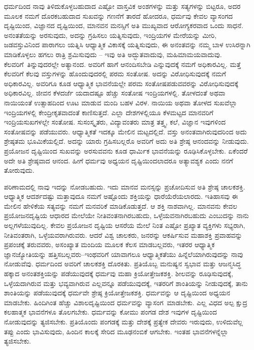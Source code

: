 ಧರ್ಮದಿಂದ ನಾವು ತಿಳಿದುಕೊಳ್ಳಬಹುದಾದ ಎಷ್ಟೋ ವಾಸ್ತವಿಕ ಅಂಶಗಳನ್ನು ಮತ್ತು ಸತ್ಯಗಳನ್ನು ಬಿಟ್ಟರೂ, ಅದರ ಮೂಲಕ ನಮಗೆ ದೊರಕಬಹುದಾದ ಸುಖವನ್ನು ಗಣನೆಗೆ ತಾರದೆ ಹೋದರೂ, ಧರ್ಮವು ಕೇವಲ ವ್ಯಾಸಂಗದ ದೃಷ್ಟಿಯಿಂದ, ವಿಜ್ಞಾನದ ದೃಷ್ಟಿಯಿಂದ, ಮಾನವನ ಮನಸ್ಸಿಗೆ ಅತಿ ಮುಖ್ಯವಾದ ಆರೋಗ್ಯಕರವಾದ ಒಂದು ಸಾಧನೆ. ಅನಂತತೆಯನ್ನು ಅರಸುವುದು, ಅದನ್ನು ಗ್ರಹಿಸಲು ಯತ್ನಿಸುವುದು, ಇಂದ್ರಿಯಗಳ ಮೇರೆಯನ್ನು ಮೀರಿ, ಜಡವಸ್ತುವಿನಿಂದ ಪಾರಾಗಲು ಯತ್ನಿಸಿ ಆಧ್ಯಾತ್ಮಿಕ ವಿಕಾಸಕ್ಕೆ ಯತ್ನಿಸುವುದು, ಈ ಅನಂತವನ್ನು ನಮ್ಮ ಬಾಳ ಉಸಿರನ್ನಾಗಿ ಮಾಡಿಕೊಳ್ಳಲು ಹಗಲು ರಾತ್ರಿ ಶ್ರಮಿಸುವುದು – ಇವು ಅತಿ ಅದ್ಭುತವಾದುವು, ಮಹಿಮಾಮಯವಾದುವು. ಕೆಲವರಿಗೆ\break\ ತಿನ್ನುವುದರಲ್ಲೇ ಅತ್ಯಾನಂದ. ಅವರಿಗೆ ಹಾಗೆ ಆನಂದಿಸಬೇಡಿ ಎನ್ನುವುದಕ್ಕೆ ನಮಗೆ ಅಧಿಕಾರವಿಲ್ಲ. ಮತ್ತೆ ಕೆಲವರಿಗೆ ಕೆಲವು ವಸ್ತುಗಳನ್ನು ಹೊಂದುವುದರಲ್ಲಿ ಪರಮ ಸಂತೋಷ. ಅದನ್ನು ವಿರೋಧಿಸುವುದಕ್ಕೆ ನಮಗೆ ಅಧಿಕಾರವಿಲ್ಲ. ಅವರಿಗೂ ಕೂಡ ಆಧ್ಯಾತ್ಮಿಕ ಭಾವನೆಯಲ್ಲೇ ಪರಮ ಸಂತೋಷಪಡುವವರನ್ನು ವಿರೋಧಿಸುವುದಕ್ಕೆ ಅಧಿಕಾರವಿಲ್ಲ. ಜೀವನ ಕೆಳದರ್ಜೆ ಯದಾದಷ್ಟೂ ಹೆಚ್ಚು ಸಂತೋಷ ಇಂದ್ರಿಯಗಳಲ್ಲಿ. ತೋಳದಂತೆ ಅಥವಾ ನಾಯಿಯಂತೆ ಉತ್ಸಾಹದಿಂದ ಊಟ ಮಾಡುವ ಮಂದಿ ಬಹಳ ವಿರಳ. ನಾಯಿಯ ಅಥವಾ ತೋಳದ ಸುಖವೆಲ್ಲಾ ಇಂದ್ರಿಯಗಳಲ್ಲಿ ಕೇಂದ್ರೀಕೃತವಾದಂತೆ ಕಾಣಿಸುತ್ತದೆ. ಎಲ್ಲಾ ದೇಶಗಳಲ್ಲಿಯೂ ಕೆಳಮಟ್ಟದ ಮಾನವರಿಗೆ ಇಂದ್ರಿಯಸುಖಗಳಲ್ಲೇ ಸಂತೋಷ. ಸುಸಂಸ್ಕೃತರು, ವಿದ್ಯಾವಂತರು ಮಾತ್ರ ತತ್ತ್ವ, ಕಲೆ, ವಿಜ್ಞಾನ ಇವುಗಳಿಂದ ಸಂತೋಷವನ್ನು ಪಡೆಯುವರು. ಆಧ್ಯಾತ್ಮಿಕತೆ ಇದಕ್ಕೂ ಮೇಲಿನ ಮಟ್ಟದಲ್ಲಿದೆ. ವಸ್ತು ಅನಂತವಾಗಿರುವುದರಿಂದ ಅದು ಶ್ರೇಷ್ಠತಮ ಭೂಮಿಕೆಯಲ್ಲಿದೆ. ಅದನ್ನು ಯಾರು ಗ್ರಹಿಸಬಲ್ಲರೊ ಅವರಿಗೆ ಅದು ಅತಿ ಶ್ರೇಷ್ಠ ಆನಂದವನ್ನು ನೀಡುವುದು. ಪ್ರಯೋಜನ ದೃಷ್ಟಿಯಿಂದ ಸುಖವನ್ನು ಅರಸುವವನು ಕೂಡ ಧಾರ್ಮಿಕ ಭಾವನೆಯನ್ನು ರೂಢಿಸಿಕೊಳ್ಳಬೇಕು. ಏಕೆಂದರೆ ಅದೇ ಅತಿ ಶ್ರೇಷ್ಠವಾದ ಆನಂದ. ಹೀಗೆ ಧರ್ಮವು ಅಧ್ಯಯನ ದೃಷ್ಟಿಯಿಂದಲಾದರೂ ಅತ್ಯಾವಶ್ಯಕ ಎಂದು ನನಗೆ ತೋರುವುದು.

ಪರಿಣಾಮದಲ್ಲಿ ನಾವು ಇದನ್ನು ನೋಡಬಹುದು. ಇದು ಮಾನವ ಮನಸ್ಸನ್ನು ಪ್ರಚೋದಿಸುವ ಅತಿ ಶ್ರೇಷ್ಠ ಚಾಲಕಶಕ್ತಿ. ಆಧ್ಯಾತ್ಮಿಕ ಆದರ್ಶದಷ್ಟು ಮತ್ತಾವುದೂ ನಮಗೆ ಅಷ್ಟೊಂದು ಶಕ್ತಿಯನ್ನು ಧಾರೆಯೆರೆಯಲಾರದು. ಇತಿಹಾಸವು ಈ ಮೇಲಿನ ಹೇಳಿಕೆಯ ಸತ್ಯವನ್ನು ನಮಗೆ ಮನವರಿಕೆ ಮಾಡಿಕೊಡುತ್ತದೆ. ಆ ಶಕ್ತಿ ನಾಶವಾಗಿಲ್ಲ. ಮಾನವನು ಕೇವಲ ಪ್ರಯೋಜನದೃಷ್ಟಿಯ ಆಧಾರದ ಮೇಲೆಯೇ ನೀತಿವಂತನಾಗಿರಬಹುದು, ಒಳ್ಳೆಯವನಾಗಿರಬಹುದು ಎಂಬುದನ್ನು ನಾನು ಅಲ್ಲಗಳೆಯುವುದಿಲ್ಲ. ಕೇವಲ ಪ್ರಯೋಜನ ದೃಷ್ಟಿಯ ಆಸರೆಯ ಮೇಲೆ ನಿಂತ ಎಷ್ಟೋ ಪ್ರಖ್ಯಾತ ವ್ಯಕ್ತಿಗಳು ಸಭ್ಯರಾಗಿ, ನೀತಿವಂತರಾಗಿ, ಒಳ್ಳೆಯವರಾಗಿರುವರು. ಆದರೆ ವಿಶ್ವ ಚಾಲಕರು, ಜನರನ್ನು ಆಕರ್ಷಿಸುವ ಮಹಾಶಕ್ತಿ ಪ್ರವಾಹವನ್ನು ಪ್ರಪಂಚಕ್ಕೆ ತರುವವರು, ಅಸಂಖ್ಯಾತ ಮಂದಿಯ ಮೂಲಕ ಕೆಲಸ ಮಾಡಬಲ್ಲವರು, ಇತರರ ಆಧ್ಯಾತ್ಮಿಕ ಜ್ಞಾನಜ್ಯೋತಿಯನ್ನು ಹತ್ತಿಸಬಲ್ಲವರು–ಇಂಥವರಿಗೆ ಯಾವಾಗಲೂ ಆಧ್ಯಾತ್ಮಿಕತೆಯು ಹಿನ್ನೆಲೆಯಾಗಿರುವುದನ್ನು ನಾವು ನೋಡುವೆವು. ಧರ್ಮದಿಂದ ಅವರಿಗೆ ಚಾಲಕಶಕ್ತಿ ದೊರಕಿತು. ಪ್ರತಿಯೊಬ್ಬ ಮನುಷ್ಯನ ಸ್ವಭಾವ ಮತ್ತು ಆಜನ್ಮಸಿದ್ಧ ಹಕ್ಕಾದ ಅನಂತಶಕ್ತಿಯನ್ನು ಪಡೆಯುವುದಕ್ಕೆ ಧರ್ಮವು ಮಹಾ ಕ್ರಿಯೋತ್ತೇಜಕಶಕ್ತಿ. ಶೀಲವನ್ನು ರೂಢಿಸುವುದಕ್ಕೆ, ಒಳ್ಳೆಯದಾಗಿರುವ ಮತ್ತು ಭವ್ಯವಾಗಿರುವ ಎಲ್ಲವನ್ನೂ ಪಡೆಯುವುದಕ್ಕೆ, ಇತರರಿಗೆ ಶಾಂತಿಯನ್ನು ನೀಡುವುದಕ್ಕೆ, ತಾನು ಶಾಂತಿಯನ್ನು ಪಡೆಯುವುದಕ್ಕೆ ಧರ್ಮವೇ ಶ್ರೇಷ್ಠ ಕ್ರಿಯೋತ್ತೇಜಕಶಕ್ತಿ. ಧರ್ಮವನ್ನು ಆ ದೃಷ್ಟಿಯಿಂದ ಅಧ್ಯಯನ ಮಾಡಬೇಕು. ಹಿಂದಿಗಿಂತ ಹೆಚ್ಚು ವಿಶಾಲದೃಷ್ಟಿಯಿಂದ ಧರ್ಮವನ್ನು ವ್ಯಾಸಂಗ\break\ ಮಾಡಬೇಕು. ಎಲ್ಲ ವಿಧದ ಅಲ್ಪ ಕ್ಷುದ್ರ ಕಲಹಾತ್ಮಕ ಭಾವನೆಗಳೂ ತೊಲಗಬೇಕು. ಧರ್ಮವನ್ನು ಕೋಮು ಪಂಗಡ ದೇಶ ಇವುಗಳ ದೃಷ್ಟಿಯಿಂದ ನೋಡುವುದನ್ನು ತ್ಯಜಿಸಬೇಕು. ಪ್ರತಿಯೊಂದು ಪಂಗಡಕ್ಕೆ ಮತ್ತು ದೇಶಕ್ಕೆ ಪ್ರತ್ಯೇಕ ದೇವರು ಇರುವುದು, ಉಳಿದುವೆಲ್ಲ ತಪ್ಪು ಎಂದು ಭಾವಿಸುವುದು, ಹಿಂದಿನ ಕಾಲಕ್ಕೆ ಸೇರಿದ ಮೂಢನಂಬಿಕೆ ಆಗಬೇಕು. ಇಂತಹ ಭಾವನೆಗಳನ್ನೆಲ್ಲಾ ತ್ಯಜಿಸಬೇಕು.

